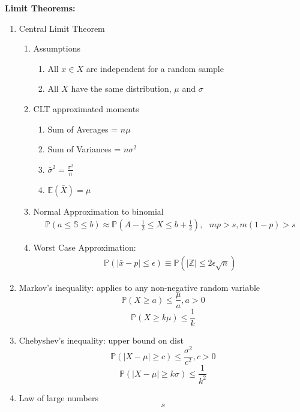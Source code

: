 \documentclass[12pt]{article}
\newcommand{\abs}[1]{\left| #1 \right|} %
\renewcommand{\=}[1]{\stackrel{#1}{=}} %
\theoremstyle{definition}
\theoremstyle{remark}
\begin{document}
\textbf{Limit Theorems:}
\begin{enumerate}
\item Central Limit Theorem
  \begin{enumerate}
  \item Assumptions
    \begin{enumerate}
    \item All $x \in X$ are independent for a random sample
    \item All $X$ have the same distribution, $\mu$ and $\sigma$
    \end{enumerate}
  \item CLT approximated moments
    \begin{enumerate}
    \item Sum of Averages = $n\mu$
    \item Sum of Variances = $n\sigma^2$
    \item $\bar{\sigma}^2 = \frac{\sigma^2}{n}$
    \item $\mathbb{E}(\bar{X}) = \mu$
    \end{enumerate}

  \item Normal Approximation to binomial
    \begin{align*}
      \mathbb{P}(a \leq \mathbb{S} \leq b) \approx
      \mathbb{P}(A-\frac{1}{2} \leq X \leq b + \frac{1}{2}),\textrm{ } mp > s, m(1-p)>s
    \end{align*}
  \item Worst Case Approximation:
    \begin{align*}
      \mathbb{P}(\abs{\bar{x}-p} \leq \epsilon) \equiv
      \mathbb{P}(\abs{\mathbb{Z}} \leq 2\epsilon\sqrt{n})
    \end{align*}
  \end{enumerate}
\item Markov's inequality: applies to any non-negative random variable
  \begin{equation}
    \mathbb{P}(X \geq a) \leq \frac{\mu}{a} , a >0
  \end{equation}
  \begin{equation}
    \mathbb{P}(X \geq k\mu) \leq \frac{1}{k}
  \end{equation}
\item Chebyshev's inequality: upper bound on dist
  \begin{equation}
    \mathbb{P}(\abs{X-\mu} \geq c) \leq \frac{\sigma^2}{c^2}, c>0
  \end{equation}
  \begin{equation}
    \mathbb{P}(\abs{X-\mu} \geq k\sigma) \leq \frac{1}{k^2}
  \end{equation}
\item Law of large numbers
  \begin{equation}
    s
  \end{equation}
\end{enumerate}
\end{document}
